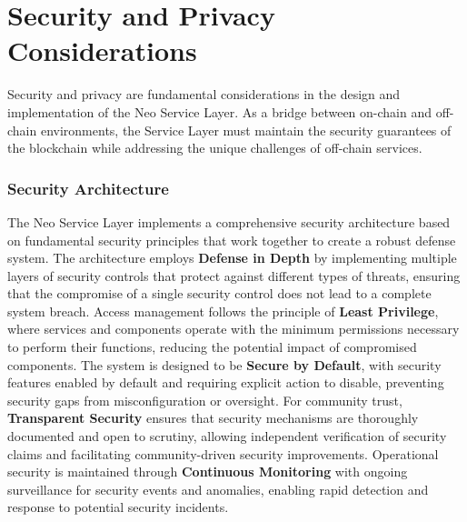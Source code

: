 \documentclass[11pt]{article}
\begin{document}
\section{Security and Privacy Considerations}
\label{subsec:nsl-security}

Security and privacy are fundamental considerations in the design and implementation of the Neo Service Layer. As a bridge between on-chain and off-chain environments, the Service Layer must maintain the security guarantees of the blockchain while addressing the unique challenges of off-chain services.

\subsubsection{Security Architecture}
\label{subsubsec:security-architecture}

The Neo Service Layer implements a comprehensive security architecture based on fundamental security principles that work together to create a robust defense system. The architecture employs \textbf{Defense in Depth} by implementing multiple layers of security controls that protect against different types of threats, ensuring that the compromise of a single security control does not lead to a complete system breach. Access management follows the principle of \textbf{Least Privilege}, where services and components operate with the minimum permissions necessary to perform their functions, reducing the potential impact of compromised components. The system is designed to be \textbf{Secure by Default}, with security features enabled by default and requiring explicit action to disable, preventing security gaps from misconfiguration or oversight. For community trust, \textbf{Transparent Security} ensures that security mechanisms are thoroughly documented and open to scrutiny, allowing independent verification of security claims and facilitating community-driven security improvements. Operational security is maintained through \textbf{Continuous Monitoring} with ongoing surveillance for security events and anomalies, enabling rapid detection and response to potential security incidents.
\end{document}
